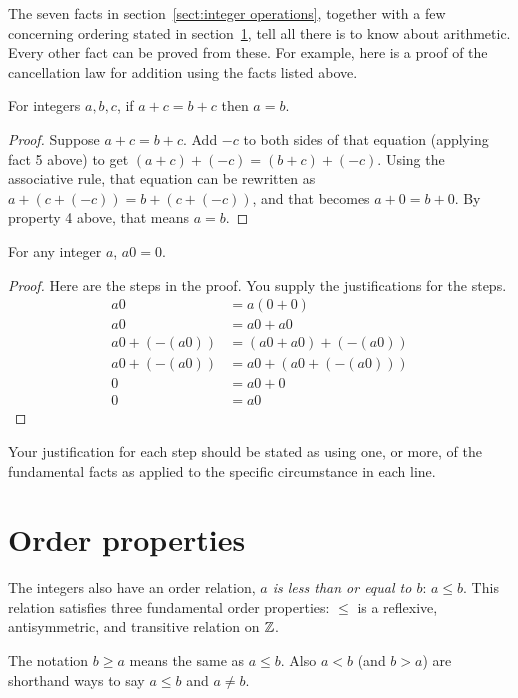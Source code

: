 The seven facts in section~\ref{sect:integer operations}, together with a few concerning ordering stated in section~\ref{sect: Z order properties},  tell all there is to 
know 
about arithmetic. Every other fact
can be proved from these. For example, here is a proof of the cancellation
law for addition using the facts listed above.

\begin{thm}
 For integers $a,b,c$, if $a+c = b+c$ then $a=b$.
\end{thm}
\begin{proof}
 Suppose $a+c=b+c$. Add $-c$ to both sides of  that equation
 (applying fact 5 above) to get
 $(a+c) + (-c) = (b+c) +(-c)$. Using the associative rule, that equation
 can be rewritten as $a+ (c+(-c)) = b + (c+(-c))$, and that becomes
 $a+0=b+0$. By property 4 above, that means $a=b$.
\end{proof}

\begin{thm}
For any integer $a$, $a0=0$.
\end{thm}
\begin{proof}
Here are the steps in the proof. You supply the justifications
for the steps.
\begin{align*}
 a0& = a(0+0) \\
 a0 & = a0 + a0 \\
 a0 + (-(a0)) & = (a0 + a0) + (-(a0)) \\
 a0 + (-(a0)) & = a0 + (a0 + (-(a0))) \\
 0 & = a0 + 0 \\
 0 & = a0
\end{align*}
\end{proof}

Your justification for each step should be stated as using one, or more, of the fundamental facts 
as applied to the specific circumstance in each line.


\clearpage
\section{Order properties}\label{sect: Z order properties}
The integers also have an order relation, {\it $a$ is less than or
equal to $b$}: $a\leq b$. This relation satisfies three fundamental
order properties: $\leq$ is a reflexive, antisymmetric, and transitive relation on $\mathbb{Z}$.
 
 The notation $b\geq a$ means the same as $a\leq b$. Also $a<b$ (and $b>a$)
 are shorthand ways to say $a\leq b$ and $a\not= b$.
 
